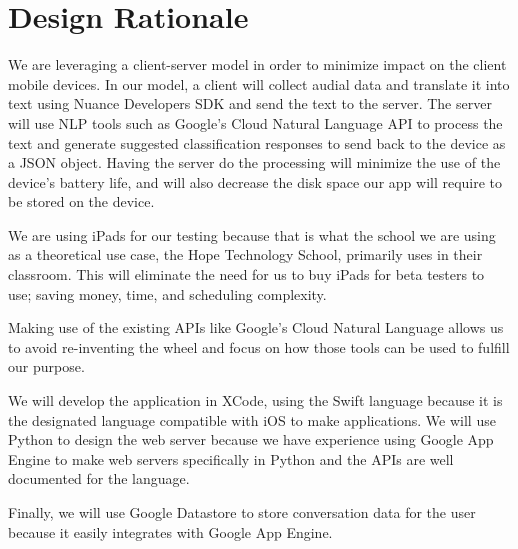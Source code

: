 \chapter{Design Rationale}\label{designRationale}

We are leveraging a client-server model in order to minimize impact on the client mobile devices. In our model, a client will collect audial data and translate it into text using Nuance Developers SDK and send the text to the server. The server will use NLP tools such as Google's Cloud Natural Language API to process the text and generate suggested classification responses to send back to the device as a JSON object. Having the server do the processing will minimize the use of the device's battery life, and will also decrease the disk space our app will require to be stored on the device. 

We are using iPads for our testing because that is what the school we are using as a theoretical use case, the Hope Technology School, primarily uses in their classroom. This will eliminate the need for us to buy iPads for beta testers to use; saving money, time, and scheduling complexity.

Making use of the existing APIs like Google's Cloud Natural Language allows us to avoid re-inventing the wheel and focus on how those tools can be used to fulfill our purpose. 

We will develop the application in XCode, using the Swift language because it is the designated language compatible with iOS to make applications. We will use Python to design the web server because we have experience using Google App Engine to make web servers specifically in Python and the APIs are well documented for the language.

Finally, we will use Google Datastore to store conversation data for the user because it easily integrates with Google App Engine.
